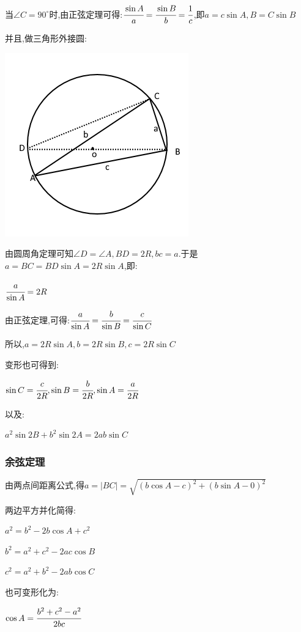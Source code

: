 \documentclass[UTF8,12pt]{ctexbook}
\newcommand{\degree}{^\circ}
\begin{document}
{{{当$\angle C = 90\degree$时,由正弦定理可得:$\cfrac{\sin A}{a} = \cfrac{\sin B}{b} = \cfrac{1}{c}$,即$a = c\sin A,B = C\sin B$

并且,做三角形外接圆:

\begin{center}
  \includegraphics[scale=0.5]{resources/insideTriangleAndCircleOutSide.png}
\end{center}

由圆周角定理可知$\angle D = \angle A,BD = 2R,bc = a$.于是$a = BC = BD\sin A = 2R\sin A$,即:

$\cfrac{a}{\sin A} = 2R$

由正弦定理,可得:$\cfrac{a}{\sin A} = \cfrac{b}{\sin B} = \cfrac{c}{\sin C}$

所以,$a = 2R\sin A,b = 2R\sin B,c = 2R\sin C$

变形也可得到:

$\sin C = \cfrac{c}{2R},\sin B = \cfrac{b}{2R},\sin A = \cfrac{a}{2R}$

以及:

$a^2\sin2B + b^2\sin2A = 2ab\sin C$
}%

\subsubsection{余弦定理}{
  由两点间距离公式,得$a = |BC| = \sqrt{(b\cos A - c)^2 + (b\sin A - 0)^2}$

  两边平方并化简得:

  $a^2 = b^2 - 2b\cos A + c^2$

  $b^2 = a^2 + c^2 - 2ac\cos B$

  $c^2 = a^2 + b^2 - 2ab\cos C$

  也可变形化为:

  $\cos A = \cfrac{b^2 + c^2 - a^2}{2bc}$

}}}
\end{document}
